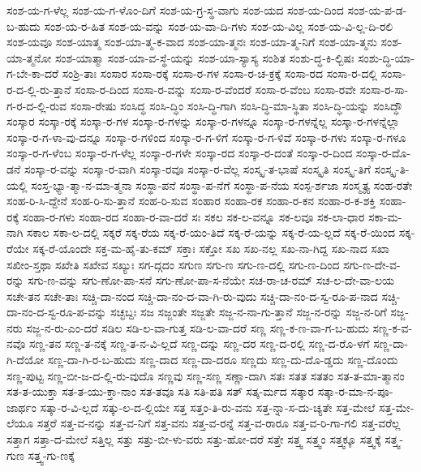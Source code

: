 {ಸಂಶ-ಯ-ಗ-ಳೆಲ್ಲ
ಸಂಶ-ಯ-ಗ-ಳೊಂ-ದಿಗೆ
ಸಂಶ-ಯ-ಗ್ರ-ಸ್ಥ-ವಾಗು
ಸಂಶ-ಯದ
ಸಂಶ-ಯ-ದಿಂದ
ಸಂಶ-ಯ-ಪ-ಡ-ಬ-ಹುದು
ಸಂಶ-ಯ-ರ-ಹಿತ
ಸಂಶ-ಯ-ವನ್ನು
ಸಂಶ-ಯ-ವಾ-ದಿ-ಗಳು
ಸಂಶ-ಯ-ವಿಲ್ಲ
ಸಂಶ-ಯ-ವಿ-ಲ್ಲ-ದಿ-ರಲಿ
ಸಂಶ-ಯವೂ
ಸಂಶ-ಯಾತ್ಮ
ಸಂಶ-ಯಾ-ತ್ಮ-ಕ-ವಾದ
ಸಂಶ-ಯಾ-ತ್ಮನಃ
ಸಂಶ-ಯಾ-ತ್ಮ-ನಿಗೆ
ಸಂಶ-ಯಾ-ತ್ಮನು
ಸಂಶ-ಯಾ-ತ್ಮನೋ
ಸಂಶ-ಯಾತ್ಮಾ
ಸಂಶ-ಯಾ-ವ-ಸ್ಥೆ-ಯನ್ನು
ಸಂಶ-ಯಾ-ಸ್ಯಾಸ್ಯ
ಸಂಶಿತ
ಸಂಶು-ದ್ಧ-ಕಿ-ಲ್ಬಿಷಃ
ಸಂಶು-ದ್ಧಿ-ಯಾ-ಗ-ಬೇ-ಕಾ-ದರೆ
ಸಂಶ್ರಿ-ತಾಃ
ಸಂಸಾರ
ಸಂಸಾ-ರಕ್ಕೆ
ಸಂಸಾ-ರ-ಗಳ
ಸಂಸಾ-ರ-ಚ-ಕ್ರಕ್ಕೆ
ಸಂಸಾ-ರದ
ಸಂಸಾ-ರ-ದಲ್ಲಿ
ಸಂಸಾ-ರ-ದ-ಲ್ಲಿ-ರು-ತ್ತಾನೆ
ಸಂಸಾ-ರ-ದಿಂದ
ಸಂಸಾ-ರ-ವನ್ನು
ಸಂಸಾ-ರ-ವೆಂದರೆ
ಸಂಸಾ-ರ-ವೆಂಬ
ಸಂಸಾ-ರವೇ
ಸಂಸಾ-ರ-ಸಾ-ಗ-ರ-ದ-ಲ್ಲಿ-ರುವ
ಸಂಸಾ-ರೇಷು
ಸಂಸಿದ್ಧ
ಸಂಸಿ-ದ್ಧಿಂ
ಸಂಸಿ-ದ್ಧಿ-ಗಾಗಿ
ಸಂಸಿ-ದ್ಧಿ-ಮಾ-ಸ್ಥಿತಾ
ಸಂಸಿ-ದ್ಧಿ-ಯನ್ನು
ಸಂಸಿದ್ಧೌ
ಸಂಸ್ಕಾರ
ಸಂಸ್ಕಾ-ರಕ್ಕೆ
ಸಂಸ್ಕಾ-ರ-ಗಳ
ಸಂಸ್ಕಾ-ರ-ಗಳನ್ನು
ಸಂಸ್ಕಾ-ರ-ಗಳನ್ನೂ
ಸಂಸ್ಕಾ-ರ-ಗಳನ್ನೆಲ್ಲ
ಸಂಸ್ಕಾ-ರ-ಗಳನ್ನೆಲ್ಲಾ
ಸಂಸ್ಕಾ-ರ-ಗ-ಳಾ-ವು-ದನ್ನೂ
ಸಂಸ್ಕಾ-ರ-ಗಳಿಂದ
ಸಂಸ್ಕಾ-ರ-ಗ-ಳಿಗೆ
ಸಂಸ್ಕಾ-ರ-ಗ-ಳಿವೆ
ಸಂಸ್ಕಾ-ರ-ಗಳು
ಸಂಸ್ಕಾ-ರ-ಗಳೂ
ಸಂಸ್ಕಾ-ರ-ಗ-ಳೆಂಬ
ಸಂಸ್ಕಾ-ರ-ಗ-ಳೆಲ್ಲ
ಸಂಸ್ಕಾ-ರ-ಗಳೇ
ಸಂಸ್ಕಾ-ರದ
ಸಂಸ್ಕಾ-ರ-ದಂತೆ
ಸಂಸ್ಕಾ-ರ-ದಿಂದ
ಸಂಸ್ಕಾ-ರ-ದೊ-ಡನೆ
ಸಂಸ್ಕಾ-ರ-ವನ್ನು
ಸಂಸ್ಕಾ-ರ-ವಾಗಿ
ಸಂಸ್ಕಾ-ರವೂ
ಸಂಸ್ಕಾ-ರ-ವೆಲ್ಲ
ಸಂಸ್ಕೃ-ತ-ಭಾಷೆ
ಸಂಸ್ಕೃತಿ
ಸಂಸ್ಕೃ-ತಿಗೆ
ಸಂಸ್ಕೃ-ತಿ-ಯಲ್ಲಿ
ಸಂಸ್ತ-ಭ್ಯಾ-ತ್ಮಾ-ನ-ಮಾ-ತ್ಮನಾ
ಸಂಸ್ಥಾ-ಪನೆ
ಸಂಸ್ಥಾ-ಪ-ನೆಗೆ
ಸಂಸ್ಥಾ-ಪ-ನೆಯ
ಸಂಸ್ಪ-ರ್ಶಜಾ
ಸಂಸ್ಮೃತ್ಯ
ಸಂಹ-ರತೇ
ಸಂಹ-ರಿ-ಸಿ-ದ್ದೇನೆ
ಸಂಹ-ರಿ-ಸು-ತ್ತಾನೆ
ಸಂಹ-ರಿ-ಸುವ
ಸಂಹಾರ
ಸಂಹಾ-ರಕ
ಸಂಹಾ-ರ-ಕನ
ಸಂಹಾ-ರ-ಕ-ಶಕ್ತಿ
ಸಂಹಾ-ರಕ್ಕೆ
ಸಂಹಾ-ರ-ಗಳು
ಸಂಹಾ-ರದ
ಸಂಹಾ-ರ-ವಾ-ದರೆ
ಸಃ
ಸಕಲ
ಸಕ-ಲ-ವನ್ನೂ
ಸಕ-ಲವೂ
ಸಕ-ಲಾ-ಧಾರ
ಸಕಾ-ಮ-ನಾಗಿ
ಸಕಾಲ
ಸಕಾ-ಲ-ದಲ್ಲಿ
ಸಕ್ಕರೆ
ಸಕ್ಕ-ರೆಯ
ಸಕ್ಕ-ರೆ-ಯಂ-ತಿದೆ
ಸಕ್ಕ-ರೆ-ಯನ್ನು
ಸಕ್ಕ-ರೆ-ಯ-ಲ್ಲದೆ
ಸಕ್ಕ-ರೆ-ಯಿಂದ
ಸಕ್ಕ-ರೆಯೇ
ಸಕ್ಕ-ರೆ-ಯೊಂದೇ
ಸಕ್ತ-ಮ-ಹೈ-ತು-ಕಮ್
ಸಕ್ತಾಃ
ಸಕ್ತೋ
ಸಖ
ಸಖ-ನಲ್ಲ
ಸಖ-ನಾ-ಗಿದ್ದ
ಸಖ-ನಾದ
ಸಖಾ
ಸಖೀಂ-ಸ್ತಥಾ
ಸಖೇತಿ
ಸಖೇವ
ಸಖ್ಯುಃ
ಸಗ-ದ್ಗದಂ
ಸಗುಣ
ಸಗು-ಣ
ಸಗು-ಣ-ದಲ್ಲಿ
ಸಗು-ಣ-ದಿಂದ
ಸಗು-ಣ-ದೇ-ವ-ರನ್ನು
ಸಗು-ಣ-ವನ್ನು
ಸಗು-ಣೋ-ಪಾ-ಸನೆ
ಸಗು-ಣೋ-ಪಾ-ಸ-ನೆಯೇ
ಸಚ-ರಾ-ಚ-ರಮ್
ಸಚ-ಲ-ದೇ-ವಾ-ಲಯ
ಸಚೇ-ತನ
ಸಚೇ-ತಾಃ
ಸಚ್ಚಿ-ದಾ-ನಂದ
ಸಚ್ಚಿ-ದಾ-ನಂ-ದ-ವಾ-ಗಿ-ರು-ವುದು
ಸಚ್ಚಿ-ದಾ-ನಂ-ದ-ಸ್ವ-ರೂ-ಪ-ನಾದ
ಸಚ್ಚಿ-ದಾ-ನಂ-ದ-ಸ್ವ-ರೂ-ಪ-ವನ್ನು
ಸಚ್ಛಬ್ದಃ
ಸಜ
ಸಜ್ಜಂತೇ
ಸಜ್ಜತೇ
ಸಜ್ಜ-ನ-ನಾ-ಗು-ತ್ತಾನೆ
ಸಜ್ಜ-ನ-ರನ್ನು
ಸಜ್ಜ-ನ-ರಿಗೆ
ಸಜ್ಜ-ನರು
ಸಜ್ಜ-ನ-ರು-ಎಂ-ದರೆ
ಸಡಿಲ
ಸಡಿ-ಲ-ವಾ-ಗುತ್ತ
ಸಡಿ-ಲ-ವಾ-ದರೆ
ಸಣ್ಣ
ಸಣ್ಣ-ಕ-ಣ-ವಾ-ಗ-ಬ-ಹುದು
ಸಣ್ಣ-ಕ-ವ-ನವೊ
ಸಣ್ಣ-ತನ
ಸಣ್ಣ-ತ-ನಕ್ಕೆ
ಸಣ್ಣ-ತ-ನ-ವಿ-ಲ್ಲದೆ
ಸಣ್ಣ-ದನ್ನು
ಸಣ್ಣ-ದರ
ಸಣ್ಣ-ದ-ರಲ್ಲಿ
ಸಣ್ಣ-ದ-ರೊ-ಳಗೆ
ಸಣ್ಣ-ದಾ-ಗಿ-ದೆಯೋ
ಸಣ್ಣ-ದಾ-ಗಿ-ರ-ಬ-ಹುದು
ಸಣ್ಣ-ದಾದ
ಸಣ್ಣ-ದಾ-ದರೂ
ಸಣ್ಣದು
ಸಣ್ಣ-ದು-ದೊ-ಡ್ಡದು
ಸಣ್ಣ-ದೊಂದು
ಸಣ್ಣ-ಪುಟ್ಟ
ಸಣ್ಣ-ಬೀ-ಜ-ದ-ಲ್ಲಿ-ರು-ವುದೊ
ಸಣ್ಣವು
ಸಣ್ಣ-ಸಣ್ಣ
ಸಣ್ಣಾ-ದಾಗಿ
ಸತಃ
ಸತತ
ಸತತಂ
ಸತ-ತ-ಮಾ-ತ್ಮಾನಂ
ಸತ-ತ-ಯುಕ್ತಾ
ಸತ-ತ-ಯು-ಕ್ತಾ-ನಾಂ
ಸತ-ತವೂ
ಸತಿ
ಸತಿ-ಪತಿ
ಸತ್
ಸತ್ಕ-ರ್ಮದ
ಸತ್ಕಾರ
ಸತ್ಕಾ-ರ-ಮಾ-ನ-ಪೂ-ಜಾರ್ಥಂ
ಸತ್ಕಾ-ರ-ವಿ-ಲ್ಲದೆ
ಸತ್ಕು-ಲ-ದ-ಲ್ಲಿಯೇ
ಸತ್ತ
ಸತ್ತಂ-ತಿ-ರು-ವನು
ಸತ್ತ-ನ್ನಾ-ಸ-ದು-ಚ್ಯತೇ
ಸತ್ತ-ಮೇಲೆ
ಸತ್ತ-ಮೇ-ಲೆಯೂ
ಸತ್ತರೆ
ಸತ್ತ-ವ-ನನ್ನು
ಸತ್ತ-ವ-ನಿಗೆ
ಸತ್ತ-ವನು
ಸತ್ತ-ವ-ರನ್ನೆ
ಸತ್ತ-ವ-ರಾರೂ
ಸತ್ತ-ವ-ರಿ-ಗಾ-ಗಲಿ
ಸತ್ತ-ವರೆಲ್ಲ
ಸತ್ತಾಗ
ಸತ್ತಾ-ದ-ಮೇಲೆ
ಸತ್ತಿಲ್ಲ
ಸತ್ತು
ಸತ್ತು-ಬೀ-ಳು-ವರು
ಸತ್ತು-ಹೋ-ದರೆ
ಸತ್ತೇ
ಸತ್ತ್ವ
ಸತ್ತ್ವಂ
ಸತ್ತ್ವಕ್ಕೂ
ಸತ್ತ್ವಕ್ಕೆ
ಸತ್ತ್ವ-ಗುಣ
ಸತ್ತ್ವ-ಗು-ಣಕ್ಕೆ
}
